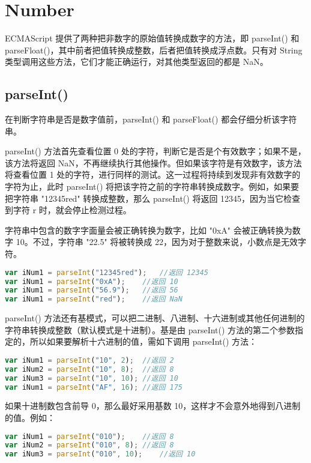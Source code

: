 \section{Number}


ECMAScript 提供了两种把非数字的原始值转换成数字的方法，即 parseInt() 和 parseFloat()，其中前者把值转换成整数，后者把值转换成浮点数。只有对 String 类型调用这些方法，它们才能正确运行，对其他类型返回的都是 NaN。


\subsection{parseInt()}

在判断字符串是否是数字值前，parseInt() 和 parseFloat() 都会仔细分析该字符串。

parseInt() 方法首先查看位置 0 处的字符，判断它是否是个有效数字；如果不是，该方法将返回 NaN，不再继续执行其他操作。但如果该字符是有效数字，该方法将查看位置 1 处的字符，进行同样的测试。这一过程将持续到发现非有效数字的字符为止，此时 parseInt() 将把该字符之前的字符串转换成数字。例如，如果要把字符串 "12345red" 转换成整数，那么 parseInt() 将返回 12345，因为当它检查到字符 r 时，就会停止检测过程。

字符串中包含的数字字面量会被正确转换为数字，比如 "0xA" 会被正确转换为数字 10。不过，字符串 "22.5" 将被转换成 22，因为对于整数来说，小数点是无效字符。



\begin{lstlisting}[language=JavaScript]
var iNum1 = parseInt("12345red");	//返回 12345
var iNum1 = parseInt("0xA");	//返回 10
var iNum1 = parseInt("56.9");	//返回 56
var iNum1 = parseInt("red");	//返回 NaN
\end{lstlisting}

parseInt() 方法还有基模式，可以把二进制、八进制、十六进制或其他任何进制的字符串转换成整数（默认模式是十进制）。基是由 parseInt() 方法的第二个参数指定的，所以如果要解析十六进制的值，需如下调用 parseInt() 方法：


\begin{lstlisting}[language=JavaScript]
var iNum1 = parseInt("10", 2);	//返回 2
var iNum2 = parseInt("10", 8);	//返回 8
var iNum3 = parseInt("10", 10);	//返回 10
var iNum1 = parseInt("AF", 16);	//返回 175
\end{lstlisting}

如果十进制数包含前导 0，那么最好采用基数 10，这样才不会意外地得到八进制的值。例如：


\begin{lstlisting}[language=JavaScript]
var iNum1 = parseInt("010");	//返回 8
var iNum2 = parseInt("010", 8);	//返回 8
var iNum3 = parseInt("010", 10);	//返回 10
\end{lstlisting}

